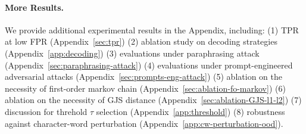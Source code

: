 \documentclass{article}
\theoremstyle{plain}
\theoremstyle{definition}
\theoremstyle{remark}
\begin{document}


\vspace{-3mm}
\paragraph{More Results.} We provide additional experimental results in the Appendix, including: (1) TPR at low FPR (Appendix~\ref{sec:tpr}) (2) ablation study on decoding strategies (Appendix~\ref{app:decoding}) (3) evaluations under paraphrasing attack (Appendix~\ref{sec:paraphrasing-attack}) (4) evaluations under prompt-engineered adversarial attacks (Appendix~\ref{sec:prompts-eng-attack}) (5) ablation on the necessity of first-order markov chain (Appendix~\ref{sec:ablation-fo-markov}) (6) ablation on the necessity of GJS distance (Appendix~\ref{sec:ablation-GJS-l1-l2}) (7) discussion for threhold $\tau$ selection (Appendix~\ref{app:threshold}) (8) robustness against character-word perturbation (Appendix~\ref{app:cw-perturbation-ood}). 
\vspace{-2mm}
\end{document}
